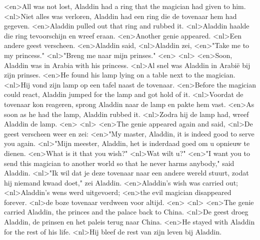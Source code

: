 <en>All was not lost, Aladdin had a ring that the magician had given to him.
<nl>Niet alles was verloren, Aladdin had een ring die de tovenaar hem had gegeven.
<en>Aladdin pulled out that ring and rubbed it.
<nl>Aladdin haalde die ring tevoorschijn en wreef eraan.
<en>Another genie appeared.
<nl>Een andere geest  verscheen.
<en>Aladdin said,
<nl>Aladdin zei,
<en>"Take me to my princess."
<nl>"Breng me naar mijn prinses."
<en>
<nl>
<en>Soon, Aladdin was in Arabia with his princess.
<nl>Al snel was Aladdin in Arabië bij zijn prinses.
<en>He found his lamp lying on a table next to the magician.
<nl>Hij vond zijn lamp op een tafel naast de tovenaar.
<en>Before the magician could react, Aladdin jumped for the lamp and got hold of it.
<nl>Voordat de tovenaar kon reageren, sprong Aladdin naar de lamp en pakte hem vast.
<en>As soon as he had the lamp, Aladdin rubbed it.
<nl>Zodra hij de lamp had, wreef Aladdin de lamp.
<en>
<nl>
<en>The genie appeared again and said,
<nl>De geest verscheen weer en zei:
<en>"My master, Aladdin, it is indeed good to serve you again.
<nl>"Mijn meester, Aladdin, het is inderdaad goed om u opnieuw te dienen.
<en>What is it that you wish?"
<nl>Wat wilt u?"
<en>"I want you to send this magician to another world so that he never harms anybody," said Aladdin.
<nl>"Ik wil dat je deze tovenaar naar een andere wereld stuurt, zodat hij niemand kwaad doet," zei Aladdin.
<en>Aladdin's wish was carried out;
<nl>Aladdin's wens werd uitgevoerd;
<en>the evil magician disappeared forever.
<nl>de boze tovenaar verdween voor altijd.
<en>
<nl>
<en>The genie carried Aladdin, the princes and the palace back to China.
<nl>De geest droeg Aladdin, de prinsen en het paleis terug naar China.
<en>He stayed with Aladdin for the rest of his life.
<nl>Hij bleef de rest van zijn leven bij Aladdin.
